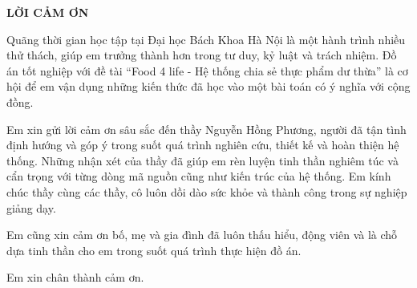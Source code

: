 \documentclass[../main.tex]{subfiles}
\begin{document}
\begin{center}
    \Large{\textbf{LỜI CẢM ƠN}}\\
\end{center}
\vspace{1cm}

\indent Quãng thời gian học tập tại Đại học Bách Khoa Hà Nội là một hành trình nhiều thử thách, giúp em trưởng thành hơn trong tư duy, kỷ luật và trách nhiệm. Đồ án tốt nghiệp với đề tài ``Food 4 life - Hệ thống chia sẻ thực phẩm dư thừa'' là cơ hội để em vận dụng những kiến thức đã học vào một bài toán có ý nghĩa với cộng đồng.

\indent Em xin gửi lời cảm ơn sâu sắc đến thầy Nguyễn Hồng Phương, người đã tận tình định hướng và góp ý trong suốt quá trình nghiên cứu, thiết kế và hoàn thiện hệ thống. Những nhận xét của thầy đã giúp em rèn luyện tinh thần nghiêm túc và cẩn trọng với từng dòng mã nguồn cũng như kiến trúc của hệ thống. Em kính chúc thầy cùng các thầy, cô luôn dồi dào sức khỏe và thành công trong sự nghiệp giảng dạy.

\indent Em cũng xin cảm ơn bố, mẹ và gia đình đã luôn thấu hiểu, động viên và là chỗ dựa tinh thần cho em trong suốt quá trình thực hiện đồ án.

\indent Em xin chân thành cảm ơn.
\end{document}
